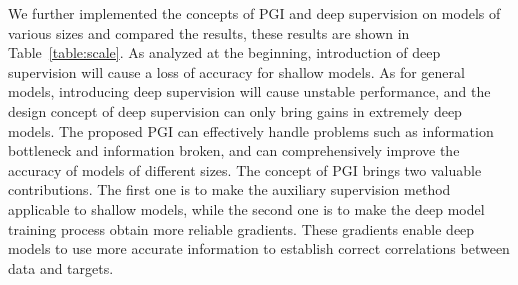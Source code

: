 \documentclass[10pt,twocolumn,letterpaper]{article}
\begin{document}
	We further implemented the concepts of PGI and deep supervision on models of various sizes and compared the results, these results are shown in Table~\ref{table:scale}.  As analyzed at the beginning, introduction of deep supervision will cause a loss of accuracy for shallow models.  As for general models, introducing deep supervision will cause unstable performance, and the design concept of deep supervision can only bring gains in extremely deep models.  The proposed PGI can effectively handle problems such as information bottleneck and information broken, and can comprehensively improve the accuracy of models of different sizes.  The concept of PGI brings two valuable contributions.  The first one is to make the auxiliary supervision method applicable to shallow models, while the second one is to make the deep model training process obtain more reliable gradients.  These gradients enable deep models to use more accurate information to establish correct correlations between data and targets.
\end{document}
